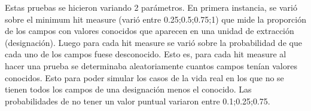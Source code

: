 Estas pruebas se hicieron variando 2 parámetros. En primera instancia, se varió sobre el minimum hit measure (varió entre 0.25;0.5;0.75;1) que mide la proporción de los campos con valores conocidos que aparecen en una unidad de extracción (designación). Luego para cada hit measure se varió sobre la probabilidad de que cada uno de los campos fuese desconocido. Esto es, para cada hit measure al hacer una prueba se determinaba aleatoriamente cuantos campos tenían valores conocidos. Esto para poder simular los casos de la vida real en los que no se tienen todos los campos de una designación menos el conocido. Las probabilidades de no tener un valor puntual variaron entre 0.1;0.25;0.75. \\


